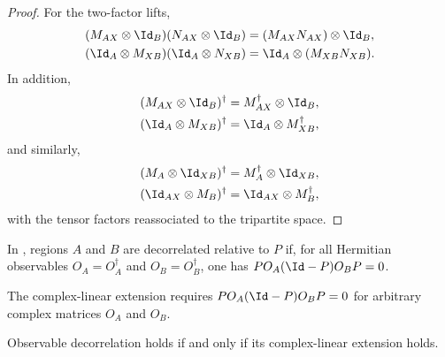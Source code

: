 \begin{proof}
    \leanok
    For the two-factor lifts,
    \begin{align}
        (M_{AX}\otimes\Id_B)(N_{AX}\otimes\Id_B)
         & =(M_{AX}N_{AX})\otimes\Id_B,
        \notag                          \\
        (\Id_A\otimes M_{XB})(\Id_A\otimes N_{XB})
         & =\Id_A\otimes(M_{XB}N_{XB}).
        \notag
    \end{align}
    In addition,
    \begin{align}
        (M_{AX}\otimes\Id_B)^\dagger
         & =M_{AX}^\dagger\otimes\Id_B,
        \notag                           \\
        (\Id_A\otimes M_{XB})^\dagger
         & =\Id_A\otimes M_{XB}^\dagger,
        \notag
    \end{align}
    and similarly,
    \begin{align}
        (M_A\otimes\Id_{XB})^\dagger
         & =M_A^\dagger\otimes\Id_{XB},
        \notag                           \\
        (\Id_{AX}\otimes M_B)^\dagger
         & =\Id_{AX}\otimes M_B^\dagger,
        \notag
    \end{align}
    with the tensor factors reassociated to the tripartite space.
\end{proof}

\begin{definition}
    \label{def:tripartite_observable_decorrelation}
    \leanok
    In \cite[Definition~D.1, lines 2187--2191]{Cirac2016MPDO_arXiv}, regions
    $A$ and $B$ are decorrelated relative to $P$ if, for all Hermitian
    observables $O_A=O_A^\dagger$ and $O_B=O_B^\dagger$, one has
    $P O_A(\Id-P)O_B P=0$.
\end{definition}

\begin{definition}
    \label{def:tripartite_decorrelation}
    \leanok
    The complex-linear extension requires
    $P O_A(\Id-P)O_B P=0$ for arbitrary complex matrices $O_A$ and $O_B$.
\end{definition}

\begin{lemma}
    \label{thm:tripartite_observable_decorrelation_iff}
    \leanok
    Observable decorrelation holds if and only if its complex-linear extension
    holds.
\end{lemma}

